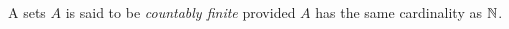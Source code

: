 \guard



\begin{defn}
\label{defn:countablyInfinite}
  A sets $A$ is said to be \emph{countably finite} provided $A$ has the same cardinality as $\mathbb{N}$.
\end{defn}
